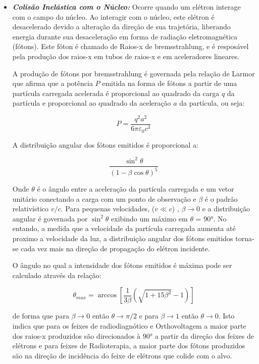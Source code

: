 \documentclass[11pt,a4paper]{article}
\begin{document}
\begin{itemize}
		\item \textbf{\textit{\textcolor{CarnationPink}{Colisão Inelástica com o Núcleo}:}} Ocorre quando um elétron interage com o campo do núcleo. Ao interagir com o núcleo, este elétron é desacelerado devido a alteração da direção de sua trajetória, liberando energia durante sua desaceleração em forma de radiação eletromagnética (fótons). Este fóton é chamado de Raios-x de bremsstrahlung, e é resposável pela produção dos raios-x em tubos de raios-x e em aceleradores lineares.
			
		A produção de fótons por bremsstrahlung é governada pela relação de Larmor que afirma que a potência $P$ emitida na forma de fótons a partir de uma partícula carregada acelerada é proporcional ao quadrado da carga $q$ da partícula e proporcional ao quadrado da aceleração $a$ da partícula, ou seja:

			\begin{equation}
				P = \frac{q^2 a^2}{6 \pi \varepsilon_0 c^3}
			\end{equation}

		A distribuição angular dos fótons emitidos é proporcional a:

			\begin{equation}
				\frac{\sin^2 \theta}{(1 - \beta \cos \theta )^5}
			\end{equation}
		
		Onde $\theta$ é o ângulo entre a aceleração da partícula carregada e um vetor unitário conectando a carga com um ponto de observação e $\beta$ é o padrão relativístico $v/c$. Para pequenas velocidades, ($v \ll c$) , $\beta \rightarrow 0$ e a distribuição angular é governada por $\sin^2\theta$ exibindo um máximo em $\theta$ = \ang{90}. No entando, a medida que a velocidade da partícula carregada aumenta até proximo a velocidade da luz, a distribuição angular dos fótons emitidos torna-se cada vez mais na direção de propagação do elétron incidente. 

		O ângulo no qual a intensidade dos fótons emitidos é máxima pode ser calculado através da relação:

			\begin{equation}
				\theta_{max} = \arccos \left[ \frac{1}{3\beta} \left(\sqrt{1 + 15 \beta^2} - 1 \right)\right] 
			\end{equation}

		de forma que para $\beta \rightarrow 0$ então $\theta \rightarrow \pi / 2$ e para $\beta \rightarrow 1$ então $\theta \rightarrow 0$. Isto indica que para os feixes de radiodiagnótico e Orthovoltagem a maior parte dos raios-x produzidos são direcionados à \ang{90} a partir da direção dos feixes de elétrons e para feixes de Radioterapia, a maior parte dos fótons produzidos são na direção de incidência do feixe de elétrons que colide com o alvo. 


\end{itemize}
\end{document}
